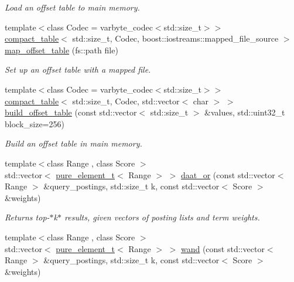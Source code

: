 \begin{DoxyCompactItemize}
\begin{DoxyCompactList}\small\item\em Load an offset table to main memory. \end{DoxyCompactList}\item 
{\footnotesize template$<$class Codec  = varbyte\+\_\+codec$<$std\+::size\+\_\+t$>$$>$ }\\\mbox{\hyperlink{classirk_1_1compact__table}{compact\+\_\+table}}$<$ std\+::size\+\_\+t, Codec, boost\+::iostreams\+::mapped\+\_\+file\+\_\+source $>$ \mbox{\hyperlink{namespaceirk_a647b6c35c655d88bb5fb522a4d77ef49}{map\+\_\+offset\+\_\+table}} (fs\+::path file)
\begin{DoxyCompactList}\small\item\em Set up an offset table with a mapped file. \end{DoxyCompactList}\item 
{\footnotesize template$<$class Codec  = varbyte\+\_\+codec$<$std\+::size\+\_\+t$>$$>$ }\\\mbox{\hyperlink{classirk_1_1compact__table}{compact\+\_\+table}}$<$ std\+::size\+\_\+t, Codec, std\+::vector$<$ char $>$ $>$ \mbox{\hyperlink{namespaceirk_af80eeaf7666165b73f3c5787bb51e407}{build\+\_\+offset\+\_\+table}} (const std\+::vector$<$ std\+::size\+\_\+t $>$ \&values, std\+::uint32\+\_\+t block\+\_\+size=256)
\begin{DoxyCompactList}\small\item\em Build an offset table in main memory. \end{DoxyCompactList}\item 
{\footnotesize template$<$class Range , class Score $>$ }\\std\+::vector$<$ \mbox{\hyperlink{namespaceirk_a1e48b43a3f40d553264380da5e7263c1}{pure\+\_\+element\+\_\+t}}$<$ Range $>$ $>$ \mbox{\hyperlink{namespaceirk_ab92f82aeeb765f3464ca61f190d8f919}{daat\+\_\+or}} (const std\+::vector$<$ Range $>$ \&query\+\_\+postings, std\+::size\+\_\+t k, const std\+::vector$<$ Score $>$ \&weights)
\begin{DoxyCompactList}\small\item\em Returns top-\/$\ast$k$\ast$ results, given vectors of posting lists and term weights. \end{DoxyCompactList}\item 
{\footnotesize template$<$class Range , class Score $>$ }\\std\+::vector$<$ \mbox{\hyperlink{namespaceirk_a1e48b43a3f40d553264380da5e7263c1}{pure\+\_\+element\+\_\+t}}$<$ Range $>$ $>$ \mbox{\hyperlink{namespaceirk_a8f6987f583ef7a5eff4291ccea6d7170}{wand}} (const std\+::vector$<$ Range $>$ \&query\+\_\+postings, std\+::size\+\_\+t k, const std\+::vector$<$ Score $>$ \&weights)

\end{DoxyCompactItemize}
